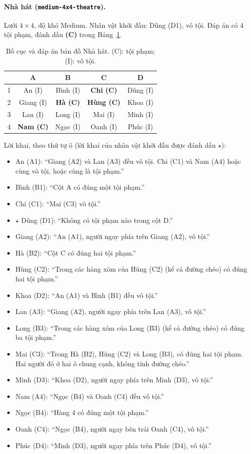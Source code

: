 \paragraph{Nhà hát (\texttt{medium-4x4-theatre}).}
Lưới $4\times4$, độ khó Medium. Nhân vật khởi đầu: Dũng (D1), vô tội. Đáp án có 4 tội phạm, đánh dấu \textbf{(C)} trong Bảng~\ref{tab:map_theatre}.
\begin{table}[htbp]
  \centering\small
  \caption{Bố cục và đáp án bản đồ Nhà hát. (C): tội phạm; (I): vô tội.}
  \label{tab:map_theatre}
  \begin{tabular}{ccccc}
    \toprule
    & A & B & C & D \\
    \midrule
    1 & An (I) & Bình (I) & \textbf{Chi (C)} & Dũng (I) \\
    2 & Giang (I) & \textbf{Hà (C)} & \textbf{Hùng (C)} & Khoa (I) \\
    3 & Lan (I) & Long (I) & Mai (I) & Minh (I) \\
    4 & \textbf{Nam (C)} & Ngọc (I) & Oanh (I) & Phúc (I) \\
    \bottomrule
  \end{tabular}
\end{table}
\noindent Lời khai, theo thứ tự ô (lời khai của nhân vật khởi đầu được đánh dấu $\star$):
\begin{itemize}\setlength{\itemsep}{0pt}\small
  \item An (A1): ``Giang (A2) và Lan (A3) đều vô tội. Chi (C1) và Nam (A4) hoặc cùng vô tội, hoặc cùng là tội phạm.''
  \item Bình (B1): ``Cột A có đúng một tội phạm.''
  \item Chi (C1): ``Mai (C3) vô tội.''
  \item $\star$ Dũng (D1): ``Không có tội phạm nào trong cột D.''
  \item Giang (A2): ``An (A1), người ngay phía trên Giang (A2), vô tội.''
  \item Hà (B2): ``Cột C có đúng hai tội phạm.''
  \item Hùng (C2): ``Trong các hàng xóm của Hùng (C2) (kể cả đường chéo) có đúng hai tội phạm.''
  \item Khoa (D2): ``An (A1) và Bình (B1) đều vô tội.''
  \item Lan (A3): ``Giang (A2), người ngay phía trên Lan (A3), vô tội.''
  \item Long (B3): ``Trong các hàng xóm của Long (B3) (kể cả đường chéo) có đúng ba tội phạm.''
  \item Mai (C3): ``Trong Hà (B2), Hùng (C2) và Long (B3), có đúng hai tội phạm. Hai người đó ở hai ô chung cạnh, không tính đường chéo.''
  \item Minh (D3): ``Khoa (D2), người ngay phía trên Minh (D3), vô tội.''
  \item Nam (A4): ``Ngọc (B4) và Oanh (C4) đều vô tội.''
  \item Ngọc (B4): ``Hàng 4 có đúng một tội phạm.''
  \item Oanh (C4): ``Ngọc (B4), người ngay bên trái Oanh (C4), vô tội.''
  \item Phúc (D4): ``Minh (D3), người ngay phía trên Phúc (D4), vô tội.''
\end{itemize}

